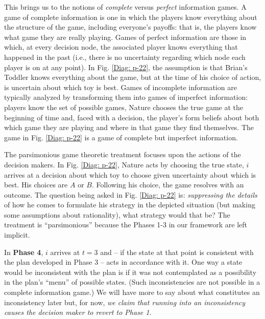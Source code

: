 \documentclass[
11pt,
titlepage,
reqno,
]{article}%
\theoremstyle{definition}
\begin{document}
This brings us to the notions of \textit{complete} versus \textit{perfect} information games. A game of complete information is one in which the players know everything about the structure of the game, including everyone's payoffs: that is, the players know what game they are really playing. Games of perfect information are those in which, at every decision node, the associated player knows everything that happened in the past (i.e., there is no uncertainty regarding which node each player is on at any point). In Fig.  \ref{Diag: p-22}, the assumption is that Brian's Toddler knows everything about the game, but at the time of his choice of action, is uncertain about which toy is best. Games of incomplete information are typically analyzed by transforming them into games of imperfect information: players know the set of possible games, Nature chooses the true game at the beginning of time and, faced with a decision,  the player's form beliefs about both which game they are playing and where in that game they find themselves. The game in Fig.  \ref{Diag: p-22} is a game of complete but imperfect information. 

The parsimonious game theoretic treatment focuses upon the actions of the decision makers. In Fig. \ref{Diag: p-22}, Nature acts by choosing the true state, $i$ arrives at a decision about which toy to choose given  uncertainty about which is  best. His choices are $A$ or $B$. Following his choice, the game resolves with an outcome. The question being asked in Fig. \ref{Diag: p-22} is: \textit{suppressing the details} of how he comes to formulate  his strategy in the depicted situation (but making some assumptions about rationality), what strategy would that be? The treatment is ``parsimonious'' because the Phases 1-3 in our framework are left implicit.


In \textbf{Phase 4}, $i$ arrives at $t=3$ and -- if the state at that point is consistent with the plan developed in Phase 3 -- acts in accordance with it. One way a state would be inconsistent with the plan is if it was not contemplated as a possibility in the plan's ``menu'' of possible states. (Such inconsistencies are not possible in a complete information game.) We will have more to say about what constitutes an inconsistency later but, for now, \textit{we claim that running into an inconsistency causes the decision maker to revert to Phase 1}.  
\end{document}
